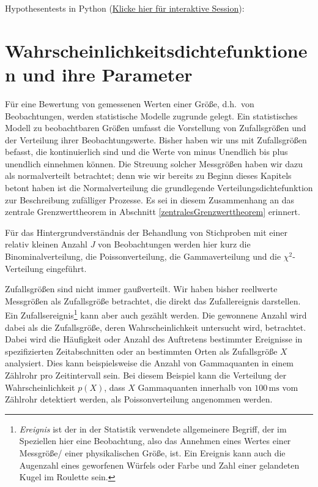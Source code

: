 Hypothesentests in Python (\href{https://mybinder.org/v2/gh/dhueser/MDA-Vorlesung-iprom-tu-bs/master?urlpath=/lab/tree/vorlesung/05_vorlesung/code/hypothesentests.ipynb}{Klicke hier für interaktive Session}):



\section{Wahrscheinlichkeitsdichtefunktionen und ihre Parameter}

Für eine Bewertung von gemessenen Werten einer Größe, d.h.\ von Beobachtungen, werden
statistische Modelle zugrunde gelegt. Ein statistisches Modell zu beobachtbaren Größen
umfasst die Vorstellung von Zufallsgrößen und der Verteilung ihrer Beobachtungswerte.
Bisher haben wir uns mit Zufallsgrößen befasst, die kontinuierlich sind und die Werte von
minus Unendlich bis plus unendlich einnehmen können. Die Streuung solcher Messgrößen haben
wir dazu als normalverteilt betrachtet; denn wie wir bereits zu Beginn dieses Kapitels betont
haben ist die Normalverteilung die grundlegende Verteilungsdichtefunktion zur Beschreibung
zufälliger Prozesse. Es sei in diesem Zusammenhang an das zentrale Grenzwerttheorem in
Abschnitt \ref{zentralesGrenzwerttheorem} erinnert.

Für das Hintergrundverständnis der Behandlung von Stichproben mit einer relativ kleinen Anzahl $J$ von
Beobachtungen werden hier kurz die Binominalverteilung, die Poissonverteilung, die Gammaverteilung
und die $\chi^2$-Verteilung eingeführt.

Zufallsgrößen sind nicht immer gaußverteilt.
Wir haben bisher reellwerte Messgrößen als Zufallsgröße betrachtet, die direkt das Zufallereignis darstellen.
Ein Zufallsereignis\footnote{\textsl{Ereignis}
 ist der in der Statistik verwendete
allgemeinere Begriff, der im Speziellen hier eine Beobachtung, also das Annehmen eines Wertes einer
Messgröße/ einer physikalischen Größe, ist.  Ein Ereignis kann auch die Augenzahl eines
geworfenen Würfels oder Farbe und Zahl einer gelandeten Kugel im Roulette sein.}
kann aber auch gezählt werden. Die gewonnene Anzahl wird dabei als die Zufallsgröße, deren
Wahrscheinlichkeit untersucht wird, betrachtet. Dabei wird die Häufigkeit oder Anzahl des
Auftretens bestimmter Ereignisse in spezifizierten Zeitabschnitten oder an bestimmten Orten
als Zufallsgröße $X$ analysiert. Dies kann beispielsweise die Anzahl von Gammaquanten in einem Zählrohr
pro Zeitintervall sein. Bei diesem Beispiel kann die Verteilung der Wahrscheinlichkeit $p(X)$, dass $X$
Gammaquanten innerhalb von $100 \, \mathrm{ms}$ vom Zählrohr detektiert werden,
als Poissonverteilung angenommen werden.

